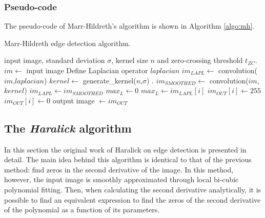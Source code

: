 \documentclass{ipol}
\numberwithin{equation}{section}
\numberwithin{table}{section}
\begin{document}
{\subsubsection{Pseudo-code}

The pseudo-code of Marr-Hildreth's algorithm is shown in Algorithm \ref{algo:mh}.

\begin{algorithm}[t!]
\caption{Marr-Hildreth edge detection algorithm.}
\label{algo:mh}
\begin{algorithmic}[1]
\REQUIRE input image, standard deviation $\sigma$, kernel size $n$ and zero-crossing threshold $t_{ZC}$.
\STATE $im \leftarrow$ input image
	\STATE Define Laplacian operator $laplacian$
	\STATE $im_{LAPL} \leftarrow$ convolution($im$,$laplacian$)
\ELSE
	\STATE $kernel \leftarrow$ generate\_kernel($n$,$\sigma$) \mynf{\label{correction_a:second_derivative:marr_algo}}.
	\STATE $im_{SMOOTHED} \leftarrow$ convolution($im$,$kernel$)
	\STATE $im_{LAPL} \leftarrow im_{SMOOTHED}$
\ENDIF
\STATE $max_L \leftarrow 0$
		\STATE $max_L \leftarrow im_{LAPL}[i]$
	\ENDIF
\ENDFOR
{}
			\STATE $im_{OUT}[i] \leftarrow 255$
		\ELSE
			\STATE $im_{OUT}[i] \leftarrow 0$
		\ENDIF
	\ENDFOR
\ENDFOR
\RETURN output image $\leftarrow im_{OUT}$
\end{algorithmic}
\end{algorithm}


\subsection{The \textit{Haralick} algorithm}

In this section the original work of Haralick \cite{bb20239} on edge detection is presented in detail.
The main idea behind this algorithm is identical to that of the previous method: find zeros in 
the second derivative of the image. In this method, however, the input image is smoothly approximated through local bi-cubic
polynomial fitting. Then, when calculating the second derivative analytically, it is possible to find 
an equivalent expression to find the zeros of the second derivative of the polynomial as a function of 
its parameters.%

}
\end{document}
